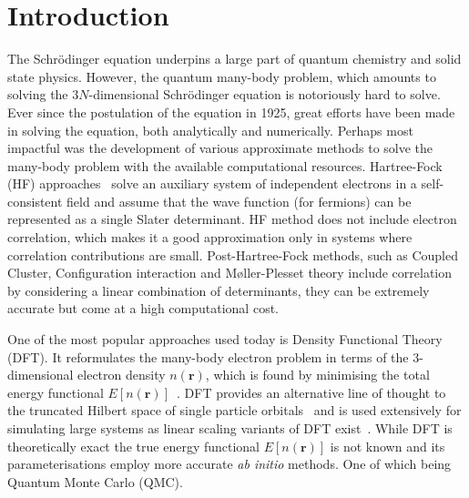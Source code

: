 \documentclass[final,3p,times,twocolumn]{elsarticle}
\begin{document}
	\tableofcontents
	
	\section{Introduction}
	\label{sec:intro}
	The Schr{\"o}dinger equation underpins a large part of quantum chemistry and solid state physics. However, the quantum many-body problem, which amounts to solving the $3N$-dimensional Schr\"odinger equation is notoriously hard to solve. Ever since the postulation of the equation in 1925, great efforts have been made in solving the equation, both analytically and numerically. Perhaps most impactful was the development of various approximate methods to solve the many-body problem with the available computational resources. Hartree-Fock (HF) approaches~\cite{hartree1928auxil, fock1930naherungsmethode} solve an auxiliary system of independent electrons in a self-consistent field and assume that the wave function (for fermions) can be represented as a single Slater determinant. HF method does not include electron correlation, which makes it a good approximation only in systems where correlation contributions are small. Post-Hartree-Fock methods, such as Coupled Cluster, Configuration interaction and M\o ller-Plesset theory include correlation by considering a linear combination of determinants, they can be extremely accurate but come at a high computational cost. 

	One of the most popular approaches used today is Density Functional Theory (DFT). It reformulates the many-body electron problem in terms of the $3$-dimensional electron density $n(\mathbf{r})$, which is found by minimising the total energy functional $E[n(\mathbf{r})]$~\cite{hohenberg1964inhomogeneous}. DFT provides an alternative line of thought to the truncated Hilbert space of single particle orbitals~\cite{kohn1999nobel} and is used extensively for simulating large systems as linear scaling variants of DFT exist~\cite{skylaris2005introducing}. 
	While DFT is theoretically exact the true energy functional $E[n(\mathbf{r})]$ is not known and its parameterisations employ more accurate \emph{ab initio} methods. One of which being Quantum Monte Carlo (QMC).
	
\end{document}

